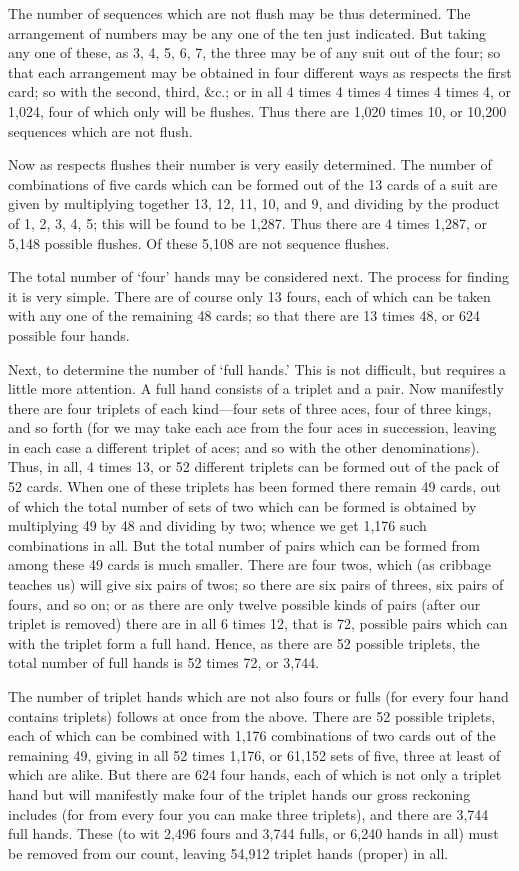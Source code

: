 \documentclass[letterpaper,12pt,oneside,openany]{memoir}
\begin{document}
The number of sequences which are not flush may
be thus determined. The arrangement of numbers may
be any one of the ten just indicated. But taking any
one of these, as 3, 4, 5, 6, 7, the three may be of any
suit out of the four; so that each arrangement may be
obtained in four different ways as respects the first card;
so with the second, third, \&c.; or in all 4 times 4 times
4 times 4 times 4, or 1,024, four of which only will be
flushes. Thus there are 1,020 times 10, or 10,200
sequences which are not flush.

Now as respects flushes their number is very easily
determined. The number of combinations of five cards
which can be formed out of the 13 cards of a suit are
given by multiplying together 13, 12, 11, 10, and 9,
and dividing by the product of 1, 2, 3, 4, 5; this will
be found to be 1,287. Thus there are 4 times 1,287, or
5,148 possible flushes. Of these 5,108 are not sequence
flushes.

The total number of `four' hands may be considered
next. The process for finding it is very simple. There
are of course only 13 fours, each of which can be taken
with any one of the remaining 48 cards; so that there
are 13 times 48, or 624 possible four hands.

Next, to determine the number of `full hands.' This
is not difficult, but requires a little more attention. A
full hand consists of a triplet and a pair. Now manifestly
there are four triplets of each kind---four sets of
three aces, four of three kings, and so forth (for we may
take each ace from the four aces in succession, leaving
in each case a different triplet of aces; and so with the
other denominations). Thus, in all, 4 times 13, or 52
different triplets can be formed out of the pack of 52
cards. When one of these triplets has been formed
there remain 49 cards, out of which the total number of
sets of two which can be formed is obtained by multiplying
49 by 48 and dividing by two; whence we get
1,176 such combinations in all. But the total number
of pairs which can be formed from among these 49 cards
is much smaller. There are four twos, which (as cribbage
teaches us) will give six pairs of twos; so there
are six pairs of threes, six pairs of fours, and so on; or
as there are only twelve possible kinds of pairs (after
our triplet is removed) there are in all 6 times 12, that
is 72, possible pairs which can with the triplet form
a full hand. Hence, as there are 52 possible triplets,
the total number of full hands is 52 times 72, or
3,744.

The number of triplet hands which are not also
fours or fulls (for every four hand contains triplets)
follows at once from the above. There are 52 possible
triplets, each of which can be combined with 1,176
combinations of two cards out of the remaining 49,
giving in all 52 times 1,176, or 61,152 sets of five,
three at least of which are alike. But there are 624
four hands, each of which is not only a triplet hand but
will manifestly make four of the triplet hands our gross
reckoning includes (for from every four you can make
three triplets), and there are 3,744 full hands. These
(to wit 2,496 fours and 3,744 fulls, or 6,240 hands in
all) must be removed from our count, leaving 54,912
triplet hands (proper) in all.
\end{document}
